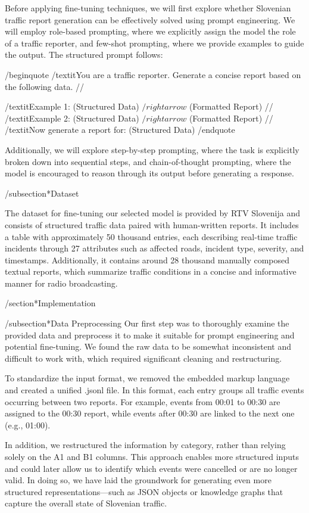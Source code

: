 Before applying fine-tuning techniques, we will first explore whether Slovenian traffic report generation can be effectively solved using prompt engineering. We will employ role-based prompting, where we explicitly assign the model the role of a traffic reporter, and few-shot prompting, where we provide examples to guide the output. The structured prompt follows:

/begin{quote}
/textit{You are a traffic reporter. Generate a concise report based on the following data.} // 

/textit{Example 1: (Structured Data) $/rightarrow$ (Formatted Report)} //
/textit{Example 2: (Structured Data) $/rightarrow$ (Formatted Report)} //
/textit{Now generate a report for: (Structured Data)}
/end{quote}

Additionally, we will explore step-by-step prompting, where the task is explicitly broken down into sequential steps, and chain-of-thought prompting, where the model is encouraged to reason through its output before generating a response.

/subsection*{Dataset}

The dataset for fine-tuning our selected model is provided by RTV Slovenija and consists of structured traffic data paired with human-written reports. It includes a table with approximately 50 thousand entries, each describing real-time traffic incidents through 27 attributes such as affected roads, incident type, severity, and timestamps. Additionally, it contains around 28 thousand manually composed textual reports, which summarize traffic conditions in a concise and informative manner for radio broadcasting.

/section*{Implementation}

/subsection*{Data Preprocessing}
Our first step was to thoroughly examine the provided data and preprocess it to make it suitable for prompt engineering and potential fine-tuning. We found the raw data to be somewhat inconsistent and difficult to work with, which required significant cleaning and restructuring.

To standardize the input format, we removed the embedded markup language and created a unified .jsonl file. In this format, each entry groups all traffic events occurring between two reports. For example, events from 00:01 to 00:30 are assigned to the 00:30 report, while events after 00:30 are linked to the next one (e.g., 01:00).

In addition, we restructured the information by category, rather than relying solely on the A1 and B1 columns. This approach enables more structured inputs and could later allow us to identify which events were cancelled or are no longer valid. In doing so, we have laid the groundwork for generating even more structured representations—such as JSON objects or knowledge graphs that capture the overall state of Slovenian traffic.


